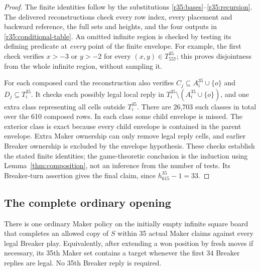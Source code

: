 \begin{proof}
The finite identities follow by the substitutions
\eqref{r35:bases}--\eqref{r35:recursion}.  The delivered reconstructions
check every row index, every placement and backward reference, the full
sets and heights, and the four outputs in
\eqref{r35:conditional-table}.  An omitted infinite region is checked
by testing its defining predicate at \emph{every} point of the finite
envelope.  For example, the first check verifies
\(x>-3\) or \(y>-2\) for every \((x,y)\in T_{557}^{35}\); this proves
disjointness from the whole infinite region, without sampling it.

For each composed card the reconstruction also verifies
\(C_j\subseteq A_i^{35}\cup\{o\}\) and \(D_j\subseteq T_i^{35}\).
It checks each possibly legal local reply in
\(T_i^{35}\setminus(A_i^{35}\cup\{o\})\), and one extra class
representing all cells outside \(T_i^{35}\).  There are 26,703 such classes in total over
the 610 composed rows.  In each class some child envelope is missed.
The exterior class is exact because every child envelope is contained
in the parent envelope.  Extra Maker ownership can only remove legal
reply cells, and earlier Breaker ownership is excluded by the envelope
hypothesis.  These checks establish the stated finite identities; the
game-theoretic conclusion is the induction using
Lemma~\ref{thm:composition}, not an inference from the number of tests.
Its Breaker-turn assertion gives the final claim, since
\(h_{615}^{35}-1=33\).
\end{proof}

\subsection{The complete ordinary opening}
\label{r35:opening}

\begin{theorem}\label{r35:theorem}
There is one ordinary Maker policy on the initially empty infinite
square board that completes an allowed copy of \(S\) within 35 actual
Maker claims against every legal Breaker play.  Equivalently, after
extending a won position by fresh moves if necessary, its 35th Maker
set contains a target whenever the first 34 Breaker replies are legal.
No 35th Breaker reply is required.
\end{theorem}

